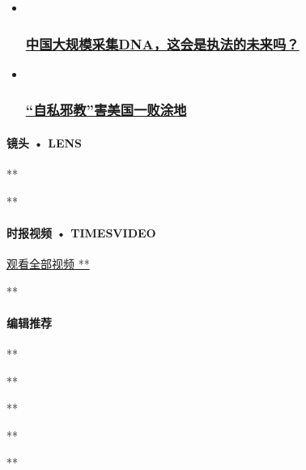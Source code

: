 \begin{itemize}
\item ~
  \hypertarget{ux4e2dux56fdux5927ux89c4ux6a21ux91c7ux96c6dnaux8fd9ux4f1aux662fux6267ux6cd5ux7684ux672aux6765ux5417}{%
  \subsubsection{\texorpdfstring{\href{/opinion/20200728/china-dna-police/}{中国大规模采集DNA，这会是执法的未来吗？}}{中国大规模采集DNA，这会是执法的未来吗？}}\label{ux4e2dux56fdux5927ux89c4ux6a21ux91c7ux96c6dnaux8fd9ux4f1aux662fux6267ux6cd5ux7684ux672aux6765ux5417}}
\item ~
  \hypertarget{ux81eaux79c1ux90aaux6559ux5bb3ux7f8eux56fdux4e00ux8d25ux6d82ux5730}{%
  \subsubsection{\texorpdfstring{\href{/opinion/20200728/us-republicans-coronavirus/}{``自私邪教''害美国一败涂地}}{``自私邪教''害美国一败涂地}}\label{ux81eaux79c1ux90aaux6559ux5bb3ux7f8eux56fdux4e00ux8d25ux6d82ux5730}}
\end{itemize}

\hypertarget{ux955cux5934--lens}{%
\paragraph{镜头 • LENS}\label{ux955cux5934--lens}}

**

**

\hypertarget{ux65f6ux62a5ux89c6ux9891--timesvideo}{%
\paragraph{时报视频 •
TIMESVIDEO}\label{ux65f6ux62a5ux89c6ux9891--timesvideo}}

\href{//www.nytimes3xbfgragh.onion/video/china}{观看全部视频 **}

**

\hypertarget{ux7f16ux8f91ux63a8ux8350}{%
\paragraph{编辑推荐}\label{ux7f16ux8f91ux63a8ux8350}}

**

**

**

**

**


